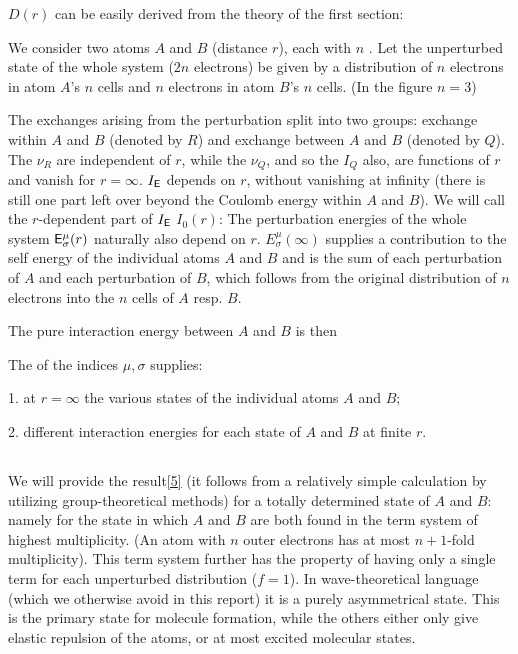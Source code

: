 \begin{paper}{1}
$D(r)$ can be easily derived from the theory of the first section:

We consider two atoms $A$ and $B$ (distance $r$), each with $n$ . Let the unperturbed state of the whole system ($2n$ electrons) be given by a distribution of $n$ electrons in atom $A$'s $n$ cells and $n$ electrons in atom $B$'s $n$ cells. (In the figure $n=3$)


The exchanges arising from the perturbation split into two groups: exchange within $A$ and $B$ (denoted by $R$) and exchange between $A$ and $B$ (denoted by $Q$). The $\nu_R$ are independent of $r$, while the $\nu_Q$, and so the $I_Q$ also, are functions of $r$ and vanish for $r=\infty$. $I_{\mathsf{E}}$ depends on $r$, without vanishing at infinity (there is still one part left over beyond the Coulomb energy within $A$ and $B$). We will call the $r$-dependent part of $I_{\mathsf{E}}$ $I_0(r)$:
The perturbation energies of the whole system $\mathsf{E}_\sigma^\mu(r)$  naturally also depend on $r$. $E_\sigma^\mu(\infty)$ supplies a contribution to the self energy of the individual atoms $A$ and $B$ and is the sum of each perturbation of $A$ and each perturbation of $B$, which follows from the original distribution of $n$ electrons into the $n$ cells of $A$ resp. $B$.

The pure interaction energy between $A$ and $B$ is then

The  of the indices $\mu,\sigma$ supplies:

1. at $r=\infty$ the various states of the individual atoms $A$ and $B$;

2. different interaction energies for each state of $A$ and $B$ at finite $r$.

\subsection{}
We will provide the result\ref{5} (it follows from a relatively simple calculation by utilizing group-theoretical methods) for a totally determined state of $A$ and $B$: namely for the state in which $A$ and $B$ are both found in the term system of highest multiplicity. (An atom with $n$ outer electrons has at most $n+1$-fold multiplicity). This term system further has the property of having only a single term for each unperturbed distribution ($f=1$). In wave-theoretical language (which we otherwise avoid in this report) it is a purely asymmetrical state. This is the primary state for molecule formation, while the others either only give elastic repulsion of the atoms, or at most excited molecular states.


\end{paper}
